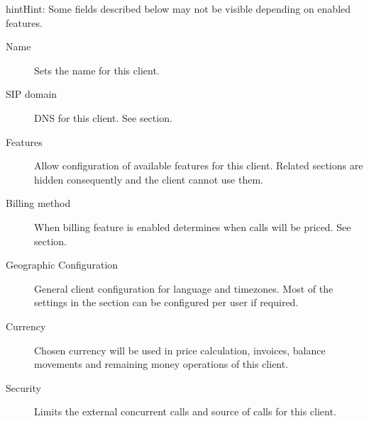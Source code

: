 \documentclass[letterpaper,10pt,english]{sphinxmanual}
\begin{document}
\begin{notice}{hint}{Hint:}
Some fields described below may not be visible depending on enabled features.
\end{notice}
\begin{description}
\item[{Name}] \leavevmode{}\label{administration_portal/brand/clients/virtual_pbx:term-name}
Sets the name for this client.

\item[{SIP domain}] \leavevmode{}\label{administration_portal/brand/clients/virtual_pbx:term-sip-domain}
DNS for this client. See {\hyperref[getting_started/internal_calls/brand_portal:client\string-sip\string-domain]{}} section.

\item[{Features}] \leavevmode{}\label{administration_portal/brand/clients/virtual_pbx:term-features}
Allow configuration of available features for this client.
Related sections are hidden consequently and the client cannot use them.

\item[{Billing method}] \leavevmode{}\label{administration_portal/brand/clients/virtual_pbx:term-billing-method}
When billing feature is enabled determines when calls will be priced. See {\hyperref[administration_portal/brand/billing/index:billing]{}} section.

\item[{Geographic Configuration}] \leavevmode{}\label{administration_portal/brand/clients/virtual_pbx:term-geographic-configuration}
General client configuration for language and timezones. Most of the settings in the section can be
configured per user if required.

\item[{Currency}] \leavevmode{}\label{administration_portal/brand/clients/virtual_pbx:term-currency}
Chosen currency will be used in price calculation, invoices, balance movements and
remaining money operations of this client.

\item[{Security}] \leavevmode{}\label{administration_portal/brand/clients/virtual_pbx:term-security}
Limits the external concurrent calls and source of calls for this client.


\end{description}
\end{document}
